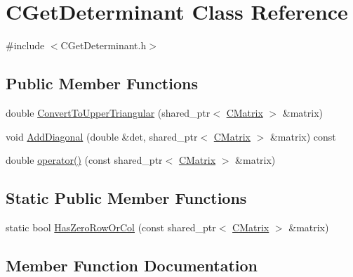 \hypertarget{classCGetDeterminant}{}\section{C\+Get\+Determinant Class Reference}
\label{classCGetDeterminant}


{\ttfamily \#include $<$C\+Get\+Determinant.\+h$>$}

\subsection*{Public Member Functions}
\begin{DoxyCompactItemize}
\item 
double \hyperlink{classCGetDeterminant_a38a5991c1bff7ad04e8e28c20f48f0e2}{Convert\+To\+Upper\+Triangular} (shared\+\_\+ptr$<$ \hyperlink{classCMatrix}{C\+Matrix} $>$ \&matrix)
\item 
void \hyperlink{classCGetDeterminant_ac69458971216a7ff77c4bf08d78f3d45}{Add\+Diagonal} (double \&det, shared\+\_\+ptr$<$ \hyperlink{classCMatrix}{C\+Matrix} $>$ \&matrix) const 
\item 
double \hyperlink{classCGetDeterminant_abf9bf718e3a52b7a200db3e0c248d0db}{operator()} (const shared\+\_\+ptr$<$ \hyperlink{classCMatrix}{C\+Matrix} $>$ \&matrix)
\end{DoxyCompactItemize}
\subsection*{Static Public Member Functions}
\begin{DoxyCompactItemize}
\item 
static bool \hyperlink{classCGetDeterminant_a77d6f05d99ec7f1519bed6a49927bb3a}{Has\+Zero\+Row\+Or\+Col} (const shared\+\_\+ptr$<$ \hyperlink{classCMatrix}{C\+Matrix} $>$ \&matrix)
\end{DoxyCompactItemize}


\subsection{Member Function Documentation}

